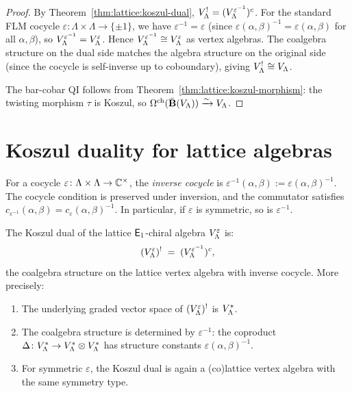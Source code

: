 \begin{proof}
By Theorem~\ref{thm:lattice:koszul-dual}, $V_\Lambda^! = (V_\Lambda^{\varepsilon^{-1}})^c$.  For the standard FLM cocycle $\varepsilon : \Lambda \times \Lambda \to \{\pm 1\}$, we have $\varepsilon^{-1} = \varepsilon$ (since $\varepsilon(\alpha,\beta)^{-1} = \varepsilon(\alpha,\beta)$ for all $\alpha,\beta$), so $V_\Lambda^{\varepsilon^{-1}} = V_\Lambda^\varepsilon$.  Hence $V_\Lambda^{\varepsilon^{-1}} \cong V_\Lambda^\varepsilon$ as vertex algebras.  The coalgebra structure on the dual side matches the algebra structure on the original side (since the cocycle is self-inverse up to coboundary), giving $V_\Lambda^! \cong V_\Lambda$.

The bar-cobar QI follows from Theorem~\ref{thm:lattice:koszul-morphism}: the twisting morphism $\tau$ is Koszul, so $\Omega^{\mathrm{ch}}(\bar{\mathbf{B}}(V_\Lambda)) \xrightarrow{\sim} V_\Lambda$.
\end{proof}



\section{Koszul duality for lattice algebras}
\label{sec:lattice:koszul}

\begin{definition}\label{def:lattice:inverse-cocycle}
For a cocycle $\varepsilon \colon \Lambda \times \Lambda \to \mathbb{C}^\times$,
the \emph{inverse cocycle} is
$\varepsilon^{-1}(\alpha,\beta) := \varepsilon(\alpha,\beta)^{-1}$.
The cocycle condition is preserved under inversion, and the commutator
satisfies
$c_{\varepsilon^{-1}}(\alpha,\beta) = c_\varepsilon(\alpha,\beta)^{-1}$.
In particular, if $\varepsilon$ is symmetric, so is $\varepsilon^{-1}$.
\end{definition}

\begin{theorem}
\label{thm:lattice:koszul-dual}
The Koszul dual of the lattice $\mathsf{E}_1$-chiral algebra
$V_\Lambda^\varepsilon$ is:
\begin{equation}\label{eq:lattice:koszul-dual}
(V_\Lambda^\varepsilon)^!
\;=\; (V_\Lambda^{\varepsilon^{-1}})^c,
\end{equation}
the coalgebra structure on the lattice vertex algebra with inverse
cocycle. More precisely:
\begin{enumerate}[label=(\roman*)]
\item The underlying graded vector space of
  $(V_\Lambda^\varepsilon)^!$ is $V_\Lambda^*$.
\item The coalgebra structure is determined by $\varepsilon^{-1}$:
  the coproduct $\Delta \colon V_\Lambda^* \to
  V_\Lambda^* \otimes V_\Lambda^*$ has structure constants
  $\varepsilon(\alpha,\beta)^{-1}$.
\item For symmetric $\varepsilon$, the Koszul dual is again a
  (co)lattice vertex algebra with the same symmetry type.
\end{enumerate}
\end{theorem}

